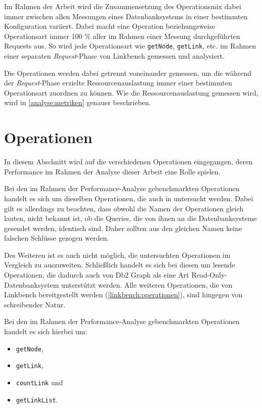 Im Rahmen der Arbeit wird die Zusammensetzung des Operationsmix dabei immer zwischen allen Messungen eines Datenbanksystems in einer bestimmten Konfiguration variiert. Dabei macht eine Operation beziehungsweise Operationsart immer 100 \% aller im Rahmen einer Messung durchgeführten Requests aus. So wird jede Operationsart wie \texttt{getNode}, \texttt{getLink}, etc. im Rahmen einer separaten \textit{Request}-Phase von Linkbench gemessen und analysiert.

Die Operationen werden dabei getrennt voneinander gemessen, um die während der \textit{Request}-Phase erzielte Ressourcenauslastung immer einer bestimmten Operationsart zuordnen zu können. Wie die Ressourcenauslastung gemessen wird, wird in \autoref{analyse:metriken} genauer beschrieben.

\section{Operationen}
\label{analyse:operationen}
In diesem Abschnitt wird auf die verschiedenen Operationen eingegangen, deren Performance im Rahmen der Analyse dieser Arbeit eine Rolle spielen. 

Bei den im Rahmen der Performance-Analyse gebenchmarkten Operationen handelt es sich um dieselben Operationen, die auch in \cite{sigmod_tian} untersucht werden. Dabei gilt es allerdings zu beachten, dass obwohl die Namen der Operationen gleich lauten, nicht bekannt ist, ob die Queries, die von ihnen an die Datenbanksysteme gesendet werden, identisch sind. Daher sollten aus den gleichen Namen keine falschen Schlüsse gezogen werden. 

Des Weiteren ist es auch nicht möglich, die untersuchten Operationen im Vergleich zu \cite{sigmod_tian} auszuweiten. Schließlich handelt es sich bei diesen um lesende Operationen, die dadurch auch von Db2 Graph als eine Art Read-Only-Datenbanksystem unterstützt werden. Alle weiteren Operationen, die von Linkbench bereitgestellt werden (\autoref{linkbench:operationen}), sind hingegen von schreibender Natur. 

Bei den im Rahmen der Performance-Analyse gebenchmarkten Operationen handelt es sich hierbei um:
\begin{itemize}
    \item \texttt{getNode},
    \item \texttt{getLink},
    \item \texttt{countLink} und
    \item \texttt{getLinkList}. 
\end{itemize}

